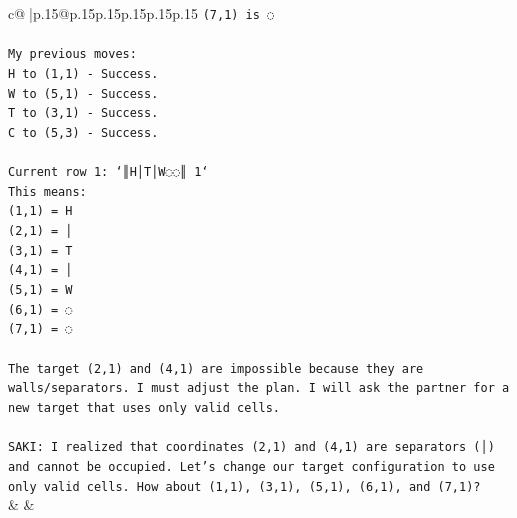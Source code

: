 \documentclass{article}
\begin{document}
{\begin{supertabular}{c@{$\;$}|p{.15\linewidth}@{}p{.15\linewidth}p{.15\linewidth}p{.15\linewidth}p{.15\linewidth}p{.15\linewidth}}
{{{\texttt{(7,1) is ◌} \\
\\ 
\texttt{My previous moves:} \\
\texttt{H to (1,1) {-} Success.} \\
\texttt{W to (5,1) {-} Success.} \\
\texttt{T to (3,1) {-} Success.} \\
\texttt{C to (5,3) {-} Success.} \\
\\ 
\texttt{Current row 1: `║H│T│W◌◌║ 1`} \\
\texttt{This means:} \\
\texttt{(1,1) = H} \\
\texttt{(2,1) = │} \\
\texttt{(3,1) = T} \\
\texttt{(4,1) = │} \\
\texttt{(5,1) = W} \\
\texttt{(6,1) = ◌} \\
\texttt{(7,1) = ◌} \\
\\ 
\texttt{The target (2,1) and (4,1) are impossible because they are walls/separators. I must adjust the plan. I will ask the partner for a new target that uses only valid cells.} \\
\\ 
\texttt{SAKI: I realized that coordinates (2,1) and (4,1) are separators (│) and cannot be occupied. Let's change our target configuration to use only valid cells. How about (1,1), (3,1), (5,1), (6,1), and (7,1)?} \\
            }
        }
    }
    & & \\ \\


\end{supertabular}}
\end{document}

